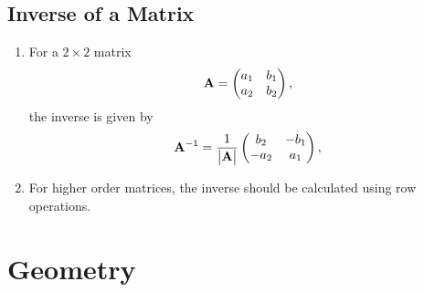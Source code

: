 \documentclass[journal,12pt,twocolumn]{IEEEtran}
\renewcommand\thesection{\arabic{section}}
\renewcommand\thesubsection{\thesection.\arabic{subsection}}
\begin{document}
\subsection{Inverse of a Matrix}
\renewcommand{\theequation}{\theenumi}
\begin{enumerate}[label=\thesubsection.\arabic*.,ref=\thesubsection.\theenumi]
\item For a $2 \times 2$ matrix 
\begin{align}
	\mathbf{A} = \begin{pmatrix}a_1 & b_1  \\ a_2 & b_2 \end{pmatrix},
\end{align}
the inverse is given by 
\begin{align}
	\mathbf{A}^{-1} = \frac{1}{\begin{vmatrix}\mathbf{A}\end{vmatrix}}\begin{pmatrix}b_2 & -b_1  \\ -a_2 & a_1 \end{pmatrix},
\end{align}
\item For higher order matrices, the inverse should be calculated using row operations.
\end{enumerate}
\section{Geometry}
\end{document}
